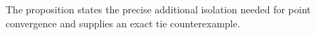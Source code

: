 The proposition states the precise additional isolation needed for point convergence and supplies an exact tie counterexample.